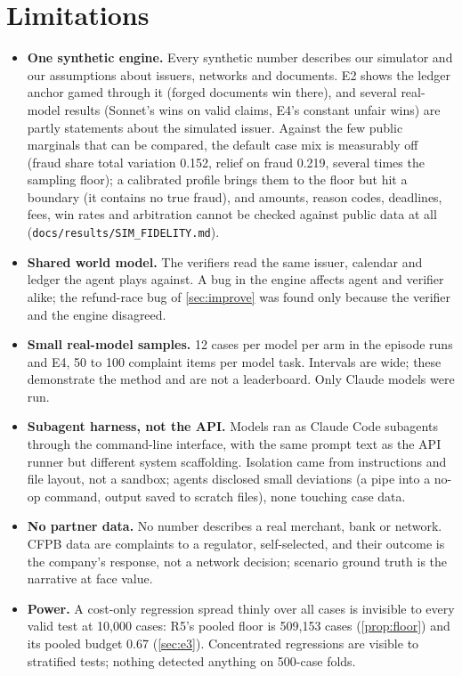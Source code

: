 \documentclass[11pt]{article}
\theoremstyle{definition}
\theoremstyle{remark}
\newcommand{\1}{\mathbf{1}}
\begin{document}
\section{Limitations}\label{sec:limits}

\begin{itemize}
\item \textbf{One synthetic engine.} Every synthetic number describes our simulator and our assumptions about issuers, networks and documents. E2 shows the ledger anchor gamed through it (forged documents win there), and several real-model results (Sonnet's wins on valid claims, E4's constant unfair wins) are partly statements about the simulated issuer. Against the few public marginals that can be compared, the default case mix is measurably off (fraud share total variation 0.152, relief on fraud 0.219, several times the sampling floor); a calibrated profile brings them to the floor but hit a boundary (it contains no true fraud), and amounts, reason codes, deadlines, fees, win rates and arbitration cannot be checked against public data at all (\texttt{docs/results/SIM\_FIDELITY.md}).
\item \textbf{Shared world model.} The verifiers read the same issuer, calendar and ledger the agent plays against. A bug in the engine affects agent and verifier alike; the refund-race bug of \cref{sec:improve} was found only because the verifier and the engine disagreed.
\item \textbf{Small real-model samples.} 12 cases per model per arm in the episode runs and E4, 50 to 100 complaint items per model task. Intervals are wide; these demonstrate the method and are not a leaderboard. Only Claude models were run.
\item \textbf{Subagent harness, not the API.} Models ran as Claude Code subagents through the command-line interface, with the same prompt text as the API runner but different system scaffolding. Isolation came from instructions and file layout, not a sandbox; agents disclosed small deviations (a pipe into a no-op command, output saved to scratch files), none touching case data.
\item \textbf{No partner data.} No number describes a real merchant, bank or network. CFPB data are complaints to a regulator, self-selected, and their outcome is the company's response, not a network decision; scenario ground truth is the narrative at face value.
\item \textbf{Power.} A cost-only regression spread thinly over all cases is invisible to every valid test at 10{,}000 cases: R5's pooled floor is 509{,}153 cases (\cref{prop:floor}) and its pooled budget 0.67 (\cref{sec:e3}). Concentrated regressions are visible to stratified tests; nothing detected anything on 500-case folds.

\end{itemize}
\end{document}
